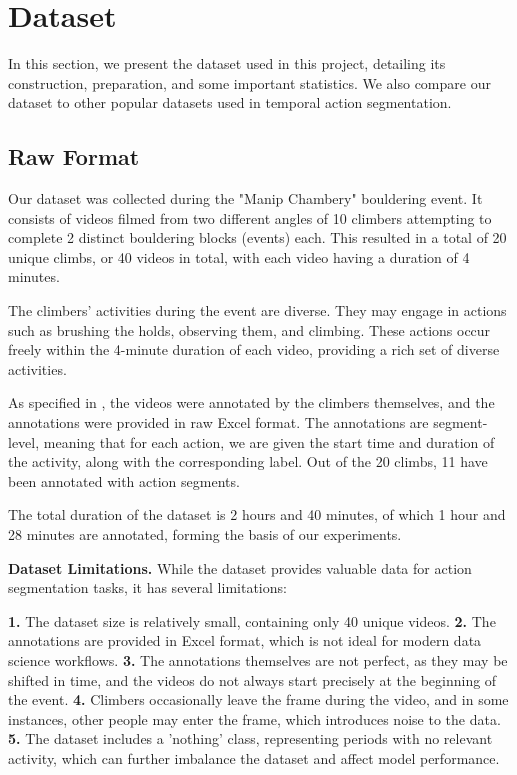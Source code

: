 \section{Dataset}

In this section, we present the dataset used in this project, detailing its construction, preparation, and some important statistics. We also compare our dataset to other popular datasets used in temporal action segmentation.

\subsection{Raw Format}

Our dataset was collected during the "Manip Chambery" bouldering event. It consists of videos filmed from two different angles of 10 climbers attempting to complete 2 distinct bouldering blocks (events) each. This resulted in a total of 20 unique climbs, or 40 videos in total, with each video having a duration of 4 minutes.

The climbers' activities during the event are diverse. They may engage in actions such as brushing the holds, observing them, and climbing. These actions occur freely within the 4-minute duration of each video, providing a rich set of diverse activities.

As specified in \cite{section:context}, the videos were annotated by the climbers themselves, and the annotations were provided in raw Excel format. The annotations are segment-level, meaning that for each action, we are given the start time and duration of the activity, along with the corresponding label. Out of the 20 climbs, 11 have been annotated with action segments.

The total duration of the dataset is 2 hours and 40 minutes, of which 1 hour and 28 minutes are annotated, forming the basis of our experiments.

\noindent\textbf{Dataset Limitations.}  
While the dataset provides valuable data for action segmentation tasks, it has several limitations: 

\textbf{1.} The dataset size is relatively small, containing only 40 unique videos.
\textbf{2.} The annotations are provided in Excel format, which is not ideal for modern data science workflows.
\textbf{3.} The annotations themselves are not perfect, as they may be shifted in time, and the videos do not always start precisely at the beginning of the event.
\textbf{4.} Climbers occasionally leave the frame during the video, and in some instances, other people may enter the frame, which introduces noise to the data.
\textbf{5.} The dataset includes a 'nothing' class, representing periods with no relevant activity, which can further imbalance the dataset and affect model performance.  

